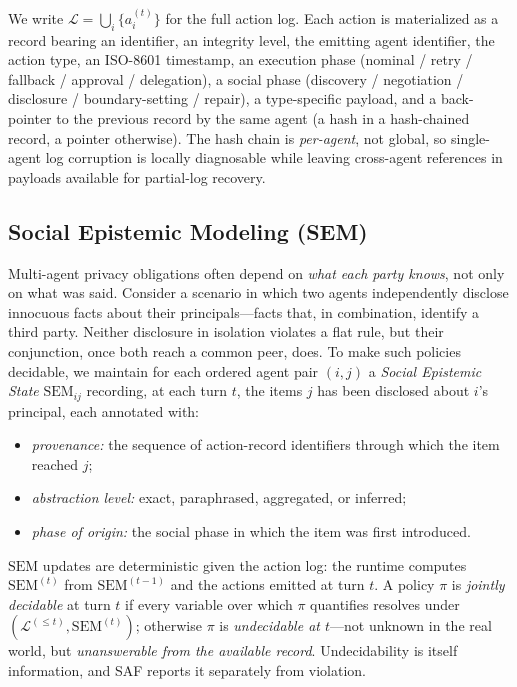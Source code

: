 \documentclass{article}
\begin{document}
We write $\mathcal{L} = \bigcup_i \{a_i^{(t)}\}$ for the full action log. Each action is materialized as a record bearing an identifier, an integrity level, the emitting agent identifier, the action type, an ISO-8601 timestamp, an execution phase (nominal / retry / fallback / approval / delegation), a social phase (discovery / negotiation / disclosure / boundary-setting / repair), a type-specific payload, and a back-pointer to the previous record by the same agent (a hash in a hash-chained record, a pointer otherwise). The hash chain is \emph{per-agent}, not global, so single-agent log corruption is locally diagnosable while leaving cross-agent references in payloads available for partial-log recovery.

\subsection{Social Epistemic Modeling (SEM)}
\label{sec:problem:sem}

Multi-agent privacy obligations often depend on \emph{what each party knows}, not only on what was said. Consider a scenario in which two agents independently disclose innocuous facts about their principals---facts that, in combination, identify a third party. Neither disclosure in isolation violates a flat rule, but their conjunction, once both reach a common peer, does. To make such policies decidable, we maintain for each ordered agent pair $(i, j)$ a \emph{Social Epistemic State} $\mathrm{SEM}_{ij}$ recording, at each turn $t$, the items $j$ has been disclosed about $i$'s principal, each annotated with:
\begin{itemize}
  \item \emph{provenance:} the sequence of action-record identifiers through which the item reached $j$;
  \item \emph{abstraction level:} exact, paraphrased, aggregated, or inferred;
  \item \emph{phase of origin:} the social phase in which the item was first introduced.
\end{itemize}

$\mathrm{SEM}$ updates are deterministic given the action log: the runtime computes $\mathrm{SEM}^{(t)}$ from $\mathrm{SEM}^{(t-1)}$ and the actions emitted at turn $t$. A policy $\pi$ is \emph{jointly decidable} at turn $t$ if every variable over which $\pi$ quantifies resolves under $(\mathcal{L}^{(\leq t)}, \mathrm{SEM}^{(t)})$; otherwise $\pi$ is \emph{undecidable at $t$}---not unknown in the real world, but \emph{unanswerable from the available record}. Undecidability is itself information, and SAF reports it separately from violation.
\end{document}
